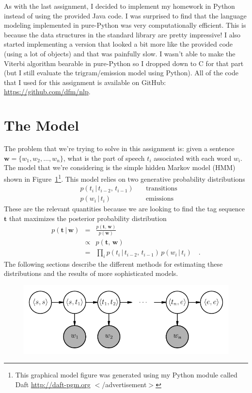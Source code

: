 \documentclass[11pt]{article}
\newcommand{\fig}[1]{Figure~\ref{fig:#1}}
\newcommand{\figlabel}[1]{\label{fig:#1}}
\newcommand{\bvec}[1]{\ensuremath{\boldsymbol{#1}}}
\begin{document}
As with the last assignment, I decided to implement my homework in Python
instead of using the provided Java code.
I was surprised to find that the language modeling implemented in pure-Python
was very computationally efficient.
This is because the data structures in the standard library are pretty
impressive!
I also started implementing a version that looked a bit more like the provided
code (using a lot of objects) and that was painfully slow.
I wasn't able to make the Viterbi algorithm bearable in pure-Python so I
dropped down to C for that part (but I still evaluate the trigram/emission
model using Python).
All of the code that I used for this assignment is available on GitHub:
\url{https://github.com/dfm/nlp}.

\section{The Model}

The problem that we're trying to solve in this assignment is: given a
sentence $\bvec{w} = \{w_1, w_2, \ldots, w_n\}$, what is the part of
speech $t_i$ associated with each word $w_i$.
The model that we're considering is the simple hidden Markov model (HMM) shown
in \fig{pgm}\footnote{This graphical model figure was generated using my
Python module called Daft \url{http://daft-pgm.org} $<$/advertisement$>$}.
This model relies on two generative probability distributions
\begin{eqnarray}
& p(t_i \,|\, t_{i-2},\,t_{i-1}) & \quad \mathrm{transitions} \\
& p(w_i \,|\, t_i) & \quad \mathrm{emissions}
\end{eqnarray}
These are the relevant quantities because we are looking to find the tag
sequence $\bvec{t}$ that maximizes the posterior probability distribution
\begin{eqnarray}
p(\bvec{t}\,|\,\bvec{w}) &=& \frac{p(\bvec{t},\,\bvec{w})}{p(\bvec{w})}
                             \nonumber\\
                         &\propto& p(\bvec{t},\,\bvec{w}) \nonumber\\
                         &=& \prod_i p(t_i \,|\, t_{i-2},\,t_{i-1}) \,
                                     p(w_i \,|\, t_i) \quad.
\end{eqnarray}
The following sections describe the different methods for estimating these
distributions and the results of more sophisticated models.

\begin{figure}[htbp]
\begin{center}
    \includegraphics{pgm.pdf}
\end{center}
\caption{%
\figlabel{pgm}}
\end{figure}
\end{document}
